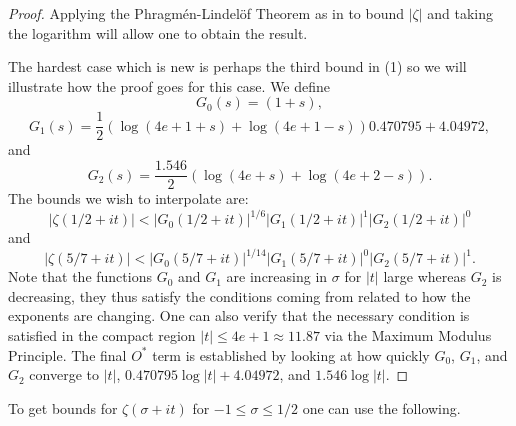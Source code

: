 \documentclass[10pt,english,letter, reqno]{amsart}
\newcommand{\Ostar}{O^{\ast}}
\theoremstyle{plain}
\theoremstyle{definition}
\begin{document}
\begin{proof}
    Applying the Phragm\'en-Lindel\"of Theorem as in \cite[Section~4]{Fiori2026} to bound $|\zeta|$ and taking the logarithm will allow one to obtain the result.

    The hardest case which is new is perhaps the third bound in (1) so we will illustrate how the proof goes for this case.
    We define
    \[ G_0(s) = (1+s), \]
    \[ G_1(s) = \frac{1}{2}(\log(4e + 1+s) + \log(4e +1 - s))0.470795  +  4.04972, \]
    and
    \[ G_2(s) = \frac{1.546}{2}(\log(4e + s) + \log(4e +2 - s)). \]
    The bounds we wish to interpolate are:
    \[ |\zeta(1/2 + it)| < |G_0(1/2+it)|^{1/6}|G_1(1/2+it)|^{1}|G_2(1/2+it)|^{0}\]
    and
    \[ |\zeta(5/7 + it)| < |G_0(5/7+it)|^{1/14}|G_1(5/7+it)|^{0}|G_2(5/7+it)|^{1}.\]
Note that the functions $G_0$ and $G_1$ are increasing in $\sigma$ for $|t|$ large whereas $G_2$ is decreasing, they thus satisfy the conditions coming from \cite[Theorem~7]{Fiori2026} related to how the exponents are changing.
One can also verify that the necessary condition is satisfied in the compact region $|t|\leq 4e+1\approx 11.87$ 
via the Maximum Modulus Principle.
The final $\Ostar$ term is established by looking at how quickly $G_0$, $G_1$, and $G_2$ converge to $|t|$, $0.470795\log|t|+4.04972$, and $1.546\log|t|$.
\end{proof}


To get bounds for $\zeta(\sigma + it)$ for $-1 \leq \sigma \leq 1/2$ one can use the following.
\end{document}
